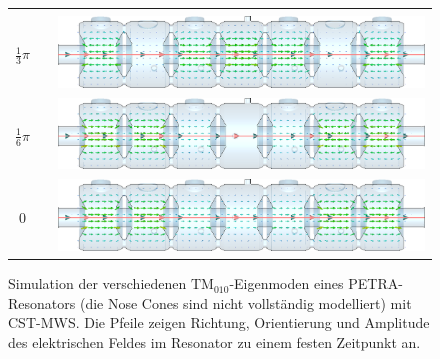 \begin{figure}[p]
\begin{tabular}{ccc}
\begin{minipage}{0.7\textwidth}
		\end{minipage} \\[3em]
		$\frac{1}{3}\pi$ &&
		\begin{minipage}{0.7\textwidth}
			\vspace{-1mm}
			\includegraphics[width=\textwidth]{./figs/TM010-CST/2_6_pi_cut.png}
		\end{minipage} \\[3em]
		$\frac{1}{6}\pi$ &&
		\begin{minipage}{0.7\textwidth}
			\vspace{-1mm}
			\includegraphics[width=\textwidth]{./figs/TM010-CST/1_6_pi_cut.png}
		\end{minipage} \\[3em]
		$0$ &&
		\begin{minipage}{0.7\textwidth}
			\vspace{-1mm}
			\includegraphics[width=\textwidth]{./figs/TM010-CST/0_cut.png}
		\end{minipage} \\[3em]

	\end{tabular}
	\caption{Simulation der verschiedenen $\mathrm{TM}_{010}$-Eigenmoden eines PETRA-Resonators (die Nose Cones sind nicht vollständig modelliert) mit CST-MWS. Die Pfeile zeigen Richtung, Orientierung und Amplitude des elektrischen Feldes im Resonator zu einem festen Zeitpunkt an.}
	\label{fig:feldverteilung_tm010}
\end{figure}